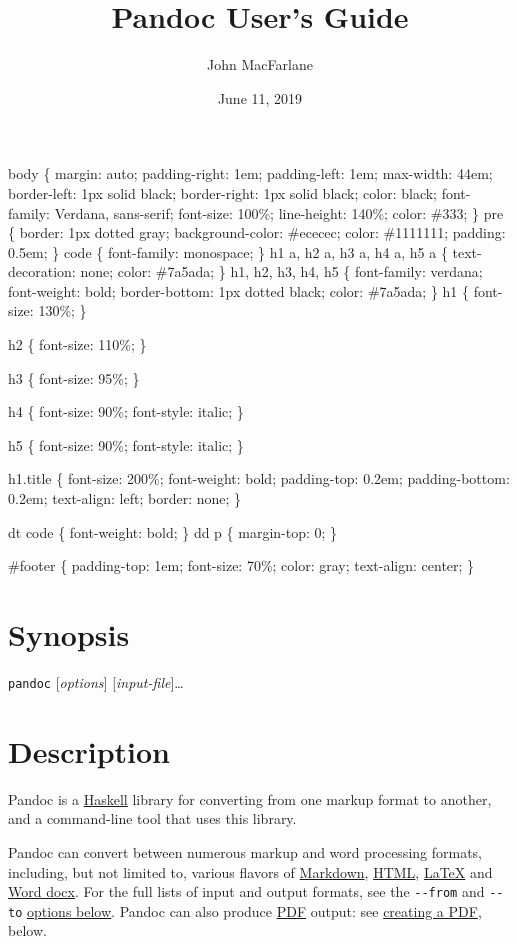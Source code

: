 \documentclass[
  12pt,
  a4paper,
]{article}
\title{Pandoc User's Guide}
\author{John MacFarlane}
\date{June 11, 2019}
\begin{document}
\maketitle

body \{ margin: auto; padding-right: 1em; padding-left: 1em; max-width: 44em; border-left: 1px
solid black; border-right: 1px solid black; color: black; font-family: Verdana, sans-serif;
font-size: 100\%; line-height: 140\%; color: \#333; \} pre \{ border: 1px dotted gray;
background-color: \#ececec; color: \#1111111; padding: 0.5em; \} code \{ font-family: monospace;
\} h1 a, h2 a, h3 a, h4 a, h5 a \{ text-decoration: none; color: \#7a5ada; \} h1, h2, h3, h4, h5
\{ font-family: verdana; font-weight: bold; border-bottom: 1px dotted black; color: \#7a5ada; \}
h1 \{ font-size: 130\%; \}

h2 \{ font-size: 110\%; \}

h3 \{ font-size: 95\%; \}

h4 \{ font-size: 90\%; font-style: italic; \}

h5 \{ font-size: 90\%; font-style: italic; \}

h1.title \{ font-size: 200\%; font-weight: bold; padding-top: 0.2em; padding-bottom: 0.2em;
text-align: left; border: none; \}

dt code \{ font-weight: bold; \} dd p \{ margin-top: 0; \}

\#footer \{ padding-top: 1em; font-size: 70\%; color: gray; text-align: center; \}

\hypertarget{synopsis}{%
\section{Synopsis}\label{synopsis}}

\texttt{pandoc} {[}\emph{options}{]} {[}\emph{input-file}{]}\ldots{}

\hypertarget{description}{%
\section{Description}\label{description}}

Pandoc is a \href{https://www.haskell.org}{Haskell} library for converting from one markup format
to another, and a command-line tool that uses this library.

Pandoc can convert between numerous markup and word processing formats, including, but not limited
to, various flavors of \href{http://daringfireball.net/projects/markdown/}{Markdown},
\href{http://www.w3.org/html/}{HTML}, \href{http://latex-project.org}{LaTeX} and
\href{https://en.wikipedia.org/wiki/Office_Open_XML}{Word docx}. For the full lists of input and
output formats, see the \texttt{-\/-from} and \texttt{-\/-to}
\protect\hyperlink{general-options}{options below}. Pandoc can also produce
\href{https://www.adobe.com/pdf/}{PDF} output: see \protect\hyperlink{creating-a-pdf}{creating a
PDF}, below.
\end{document}
